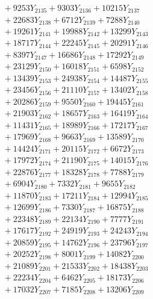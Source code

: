 \documentclass[a4paper,10pt]{article}
\begin{document}
{\begin{align}
&\;  + 9253 Y_{2135} + 9303 Y_{2136} + 10215 Y_{2137} \\[0.3ex]
&\;  + 22683 Y_{2138} + 6712 Y_{2139} + 7288 Y_{2140} \\[0.3ex]
&\;  + 19261 Y_{2141} + 19988 Y_{2142} + 13299 Y_{2143} \\[0.3ex]
&\;  + 18717 Y_{2144} + 22245 Y_{2145} + 20291 Y_{2146} \\[0.3ex]
&\;  + 8397 Y_{2147} + 16686 Y_{2148} + 17292 Y_{2149} \\[0.3ex]
&\;  + 23129 Y_{2150} + 16018 Y_{2151} + 6598 Y_{2152} \\[0.3ex]
&\;  + 13439 Y_{2153} + 24938 Y_{2154} + 14487 Y_{2155} \\[0.3ex]
&\;  + 23456 Y_{2156} + 21110 Y_{2157} + 13402 Y_{2158} \\[0.5ex]\allowbreak
&\;  + 20286 Y_{2159} + 9550 Y_{2160} + 19445 Y_{2161} \\[0.3ex]
&\;  + 21903 Y_{2162} + 18657 Y_{2163} + 16419 Y_{2164} \\[0.3ex]
&\;  + 11431 Y_{2165} + 18989 Y_{2166} + 17217 Y_{2167} \\[0.3ex]
&\;  + 17969 Y_{2168} + 9663 Y_{2169} + 13589 Y_{2170} \\[0.3ex]
&\;  + 14424 Y_{2171} + 20115 Y_{2172} + 6672 Y_{2173} \\[0.3ex]
&\;  + 17972 Y_{2174} + 21190 Y_{2175} + 14015 Y_{2176} \\[0.3ex]
&\;  + 22876 Y_{2177} + 18328 Y_{2178} + 7788 Y_{2179} \\[0.3ex]
&\;  + 6904 Y_{2180} + 7332 Y_{2181} + 9655 Y_{2182} \\[0.3ex]
&\;  + 11870 Y_{2183} + 17211 Y_{2184} + 12994 Y_{2185} \\[0.3ex]
&\;  + 12699 Y_{2186} + 7330 Y_{2187} + 16875 Y_{2188} \\[0.5ex]\allowbreak
&\;  + 22348 Y_{2189} + 22134 Y_{2190} + 7777 Y_{2191} \\[0.3ex]
&\;  + 17617 Y_{2192} + 24919 Y_{2193} + 24243 Y_{2194} \\[0.3ex]
&\;  + 20859 Y_{2195} + 14762 Y_{2196} + 23796 Y_{2197} \\[0.3ex]
&\;  + 20252 Y_{2198} + 8001 Y_{2199} + 14082 Y_{2200} \\[0.3ex]
&\;  + 21089 Y_{2201} + 21533 Y_{2202} + 18438 Y_{2203} \\[0.3ex]
&\;  + 22234 Y_{2204} + 6462 Y_{2205} + 18173 Y_{2206} \\[0.3ex]
&\;  + 17032 Y_{2207} + 7185 Y_{2208} + 13206 Y_{2209} \\[0.3ex]

\end{align}}
\end{document}
